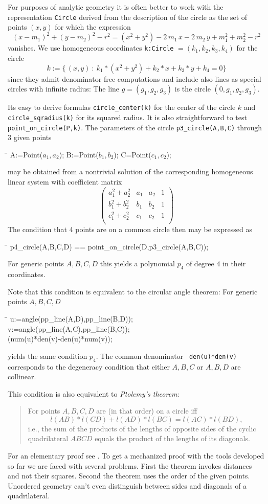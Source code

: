 \documentclass{article}
\newenvironment{code}{\tt \begin{tabbing}
\hspace*{1cm}\=\hspace*{1cm}\=\hspace*{1cm}\=
\hspace*{1cm}\=\hspace*{1cm}\=\kill
}{\end{tabbing}}
\begin{document}
For purposes of analytic geometry it is often better to work with the
representation {\tt Circle} derived from the description of the circle
as the set of points $(x,y)$ for which the expression
\[(x-m_1)^2+(y-m_2)^2-r^2 = (x^2+y^2) -2\,m_1\,x -2\,m_2\,y
+m_1^2+m_2^2-r^2 \] 
vanishes. We use homogeneous coordinates {\tt k:Circle}
$=(k_1,k_2,k_3,k_4)$ for the circle
\[k:=\{\,(x,y)\ :\ k_1*(x^2+y^2)+k_2*x+k_3*y+k_4 = 0\}\]
since they admit denominator free computations and include also lines
as special circles with infinite radius: The line $g=(g_1,g_2,g_3)$ is
the circle $(0,g_1,g_2,g_3)$.

Its easy to derive formulas {\tt circle\_center(k)} for the center of
the circle $k$ and {\tt circle\_sqradius(k)} for its squared radius.
It is also straightforward to test {\tt point\_on\_circle(P,k)}.  The
parameters of the circle {\tt p3\_circle(A,B,C)} through 3 given
points 
\begin{code}\>
A:=Point($a_1,a_2$); B:=Point($b_1,b_2$); C=Point($c_1,c_2$); 
\end{code}
may be obtained from a nontrivial solution of the corresponding
homogeneous linear system with coefficient matrix
\[\left(\begin{array}{cccc} 
a_1^2+a_2^2 & a_1 & a_2 & 1 \\ b_1^2+b_2^2 & b_1 & b_2 & 1 \\
c_1^2+c_2^2 & c_1 & c_2 & 1 \\
\end{array}\right)
\] 
The condition that 4 points are on a common circle then may be
expressed as
\begin{code}\>
p4\_circle(A,B,C,D) == point\_on\_circle(D,p3\_circle(A,B,C));
\end{code}
For generic points $A,B,C,D$ this yields a polynomial $p_4$ of degree
4 in their coordinates.

Note that this condition is equivalent to the circular angle theorem:
For generic points $A,B,C,D$
\begin{code}\+\>
  u:=angle(pp\_line(A,D),pp\_line(B,D));\\
  v:=angle(pp\_line(A,C),pp\_line(B,C));\\
  (num(u)*den(v)-den(u)*num(v));
\end{code}
yields the same condition $p_4$. The common denominator {\tt
den(u)*den(v)} corresponds to the degeneracy condition that either
$A,B,C$ or $A,B,D$ are collinear.
\medskip

This condition is also equivalent to {\em Ptolemy's theorem}:
\begin{quote}
For points $A,B,C,D$ are (in that order) on a circle iff
\[l(AB)*l(CD)+l(AD)*l(BC) = l(AC)*l(BD),\]
i.e., the sum of the products of the lengths of opposite sides of the
cyclic quadrilateral $ABCD$ equals the product of the lengths of its
diagonals. 
\end{quote}
For an elementary proof see \cite[2.61]{Coxeter:67}. To get a
mechanized proof with the tools developed so far we are faced with
several problems. First the theorem invokes distances and not their
squares. Second the theorem uses the order of the given points.
Unordered geometry can't even distinguish between sides and diagonals
of a quadrilateral.
\end{document}
